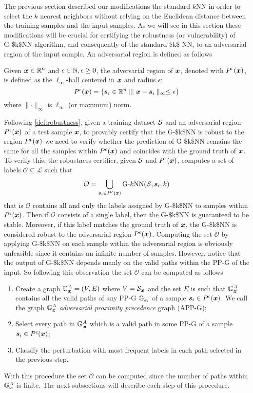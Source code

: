 The previous section described our modifications the standard $k$NN in order to select the $k$ nearest neighbors without relying on the Euclidean distance between the training samples and the input samples. As we will see in this section these modifications will be crucial for certifying the robustness (or vulnerability) of \acs{G-$k$NN} algorithm, and consequently of the standard \acs{$k$-NN}, to an adversarial region of the input sample. An adversarial region is defined as follows

\begin{definition}
\label{def:adv-region}
Given $\vinput \in \R$ and $\epsilon \in \N, \epsilon \ge 0$, the adversarial region of $\vinput$, denoted with $\pert$, is defined as the $\ell_{\infty}$-ball centered in $\vinput$ and radius $\epsilon$:
\[
  \pert = \{\sample \in \R \mid \parallel \vinput - \sample \parallel_\infty \le \epsilon\}
\]
where $\parallel \cdot \parallel_\infty$ is $\ell_\infty$ (or maximum) norm.
\end{definition}

Following \autoref{def:robustness}, given a training dataset $\set$ and an adversarial region $\pert$ of a test sample $\vinput$, to provably certify that the \acs{G-$k$NN} is robust to the region $\pert$ we need to verify whether the prediction of \acs{G-$k$NN} remains the same for all the samples within $\pert$ and coincides with the ground truth of $\vinput$. To verify this, the robustness certifier, given $\set$ and $\pert$, computes a set of labels $\mathcal{O}\subseteq  \mathcal{L}$ such that
\[
  \mathcal{O} = \bigcup_{\sample \in \pert} \text{G-}k\text{NN}(\set, \sample, k)
\]
that is $\mathcal{O}$ contains all and only the labels assigned by \acs{G-$k$NN} to samples within $\pert$. Then if $\mathcal{O}$ consists of a single label, then the \acs{G-$k$NN} is guaranteed to be stable. Moreover, if this label matches the ground truth of $\vinput$, the \acs{G-$k$NN} is considered robust to the adversarial region $\pert$. Computing the set $\mathcal{O}$ by applying \acs{G-$k$NN} on each sample within the adversarial region is obviously unfeasible since it contains an infinite number of samples. However, notice that the output of \acs{G-$k$NN} depends manly on the valid paths within the \acs{PP-G} of the input. So following this observation the set $\mathcal{O}$ can be computed as follows
\begin{enumerate}
  \item Create a graph $\APPG = (V, E)$ where $V = \set_{\vinput}$ and the set $E$ is such that $\APPG$ contains all the valid paths of any \acs{PP-G} $\PPG[\sample]$ of a sample  $\sample \in \pert$. We call the graph $\APPG$ \emph{adversarial proximity precedence} graph (\acs{APP-G});
  \item Select every path in $\APPG$ which is a valid path in some \acs{PP-G} of a sample  $\sample \in \pert$;
  \item Classify the perturbation with most frequent labels in each path selected in the previous step.
\end{enumerate}
With this procedure the set $\mathcal{O}$ can be computed since the number of paths within $\APPG$ is finite. The next subsections will describe each step of this procedure.

